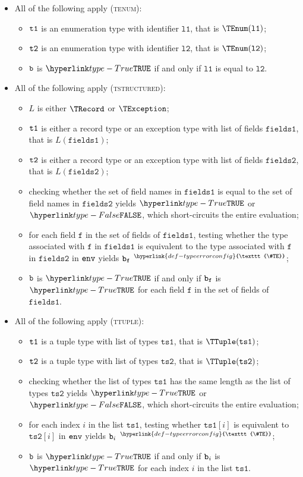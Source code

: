 \documentclass{book}
\newcommand\TypeErrorConfig[0]{\hyperlink{def-typeerrorconfig}{\texttt{\#TE}}}
\newcommand\ProseOrTypeError[0]{\hyperlink{def-proseortypeerror}{$^{\TypeErrorConfig}$}}
\newcommand\vf[0]{\texttt{f}}
\newcommand\vtsone[0]{\texttt{ts1}}
\newcommand\vtstwo[0]{\texttt{ts2}}
\newcommand\vfieldsone[0]{\texttt{fields1}}
\newcommand\vfieldstwo[0]{\texttt{fields2}}
\newcommand\vlone[0]{\texttt{l1}}
\newcommand\vltwo[0]{\texttt{l2}}
\begin{document}
\begin{itemize}
  \item All of the following apply (\textsc{tenum}):
  \begin{itemize}
    \item $\texttt{t1}$ is an enumeration type with identifier $\vlone$, that is $\TEnum(\vlone)$;
    \item $\texttt{t2}$ is an enumeration type with identifier $\vltwo$, that is $\TEnum(\vltwo)$;
    \item $\texttt{b}$ is $\True$ if and only if $\vlone$ is equal to $\vltwo$.
  \end{itemize}

  \item All of the following apply (\textsc{tstructured}):
  \begin{itemize}
    \item $L$ is either $\TRecord$ or $\TException$;
    \item $\texttt{t1}$ is either a record type or an exception type with list of fields $\vfieldsone$, that is $L(\vfieldsone)$;
    \item $\texttt{t2}$ is either a record type or an exception type with list of fields $\vfieldstwo$, that is $L(\vfieldstwo)$;
    \item checking whether the set of field names in $\vfieldsone$ is equal to the set of field names in $\vfieldstwo$
          yields $\True$ or $\False$, which short-circuits the entire evaluation;
    \item for each field $\vf$ in the set of fields of $\vfieldsone$, testing whether the type associated with
          $\vf$ in $\vfieldsone$ is equivalent to the type associated with
          $\vf$ in $\vfieldstwo$ in $\texttt{env}$ yields $\vb_\vf$ \ProseOrTypeError;
    \item $\texttt{b}$ is $\True$ if and only if $\vb_\vf$ is $\True$ for each field $\vf$ in the set of fields of $\vfieldsone$.
  \end{itemize}

  \item All of the following apply (\textsc{ttuple}):
  \begin{itemize}
    \item $\texttt{t1}$ is a tuple type with list of types $\vtsone$, that is $\TTuple(\vtsone)$;
    \item $\texttt{t2}$ is a tuple type with list of types $\vtstwo$, that is $\TTuple(\vtstwo)$;
    \item checking whether the list of types $\vtsone$ has the same length as the list of types $\vtstwo$ yields $\True$
          or $\False$, which short-circuits the entire evaluation;
    \item for each index $i$ in the list $\vtsone$, testing whether $\vtsone[i]$ is equivalent to $\vtstwo[i]$ in $\texttt{env}$
          yields $\texttt{b}_i$ \ProseOrTypeError;
    \item $\texttt{b}$ is $\True$ if and only if $\texttt{b}_i$ is $\True$ for each index $i$ in the list $\vtsone$.
  \end{itemize}
\end{itemize}
\end{document}
